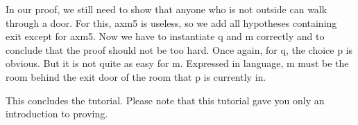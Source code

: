 In our proof, we still need to show that anyone who is not \textsf{outside} can walk through a door. For this, \textsf{axm5} is useless, so we add all hypotheses containing exit except for \textsf{axm5}. Now we have to instantiate \textsf{q} and \textsf{m} correctly and to conclude that the proof should not be too hard. Once again, for \textsf{q}, the choice \textsf{p} is obvious. But it is not quite as easy for \textsf{m}. Expressed in language, \textsf{m} must be the room behind the exit door of the room that \textsf{p} is currently in. 


This concludes the tutorial. Please note that this tutorial gave you only an introduction to proving.
